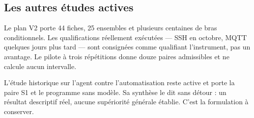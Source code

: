 \subsection{Les autres études actives}

Le plan V2 porte 44 fiches, 25 ensembles et plusieurs centaines de bras
conditionnels. Les qualifications réellement exécutées --- SSH en octobre, MQTT
quelques jours plus tard --- sont consignées comme qualifiant l'instrument, pas
un avantage. Le pilote à trois répétitions donne douze paires admissibles et ne
calcule aucun intervalle.

L'étude historique sur l'agent contre l'automatisation reste active et porte la
paire S1 et le programme sans modèle. Sa synthèse le dit sans détour : un
résultat descriptif réel, aucune supériorité générale établie. C'est la
formulation à conserver.
